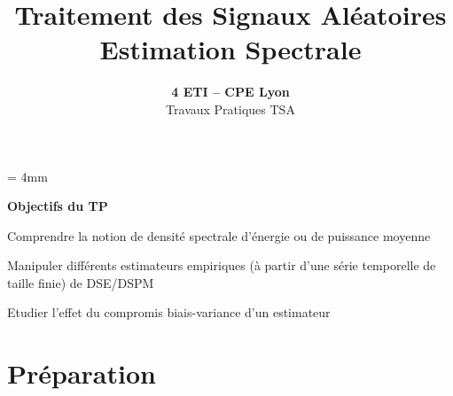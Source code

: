 \documentclass{article}
\begin{document}
\baselineskip = 4mm
\title{Traitement des Signaux Aléatoires \\
Estimation Spectrale}
\author{\textbf{4 ETI -- CPE Lyon }\\[3mm]
{Travaux Pratiques TSA}}
\date{}

\maketitle

\noindent{}
\vspace*{5mm}


\textbf{\Large Objectifs du TP}\\[4mm]

\begin{list}{-}{\setlength{\leftmargin}{3mm} \setlength{\labelwidth}{20mm} \setlength{\labelsep}{2mm} \setlength{\itemsep}{1mm} }
\item Comprendre la notion de densité spectrale d'énergie ou de puissance moyenne
\item Manipuler différents estimateurs empiriques (à partir d'une série temporelle de taille finie) de DSE/DSPM
\item Etudier l'effet du compromis biais-variance d'un estimateur
\end{list}


\vspace*{5mm}

\section{Préparation}
\end{document}
